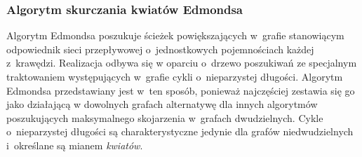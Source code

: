 \subsubsection{\textbf{Algorytm skurczania kwiatów Edmondsa}}\label{ss_edmonds_blossom}
\par{
  Algorytm Edmondsa poszukuje ścieżek powiększających w~grafie stanowiącym odpowiednik sieci przepływowej o~jednostkowych pojemnościach każdej z~krawędzi.
  Realizacja odbywa się w oparciu o~drzewo poszukiwań ze specjalnym traktowaniem występujących w~grafie cykli o~nieparzystej długości.
  Algorytm Edmondsa przedstawiany jest w~ten sposób, ponieważ najczęściej zestawia się go jako działającą w dowolnych grafach alternatywę dla innych algorytmów poszukujących maksymalnego skojarzenia w~grafach dwudzielnych.
  Cykle o~nieparzystej długości są charakterystyczne jedynie dla grafów niedwudzielnych i~określane są mianem \emph{kwiatów}.
}
